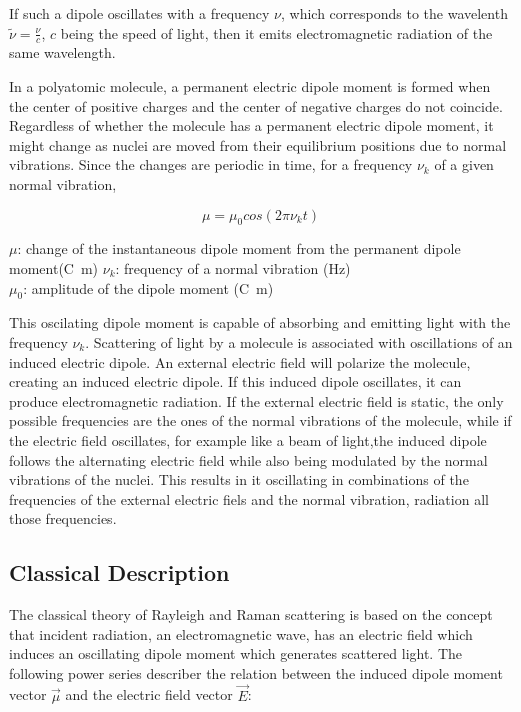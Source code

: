 If such a dipole oscillates with a frequency \(\nu\), which corresponds to the wavelenth \(\widetilde{\nu}=\frac{\nu}{c}\), \(c\) being the speed of light, then it emits electromagnetic radiation of the same wavelength.

\bigskip

In a polyatomic molecule, a permanent electric dipole moment is formed when the center of positive charges and the center of negative charges do not coincide. Regardless of whether the molecule has a permanent electric dipole moment, it might change as nuclei are moved from their equilibrium positions due to normal vibrations. Since the changes are periodic in time, for a frequency \(\nu_k\) of a given normal vibration, 

\begin{equation}
    \mu=\mu_0cos(2\pi\nu_kt)
\end{equation}

\(\mu\): change of the instantaneous dipole moment from the permanent dipole moment(\unit{\coulomb\meter})
\(\nu_k\): frequency of a normal vibration (\unit{\hertz})\\
\(\mu_0\): amplitude of the dipole moment (\unit{\coulomb\meter})

\bigskip

This oscilating dipole moment is capable of absorbing and emitting light with the frequency \(\nu_k\).
Scattering of light by a molecule is associated with oscillations of an induced electric dipole. An external electric field will polarize the molecule, creating an induced electric dipole. If this induced dipole oscillates, it can produce electromagnetic radiation. If the external electric field is static, the only possible frequencies are the ones of the normal vibrations of the molecule, while if the electric field oscillates, for example like a beam of light,the induced dipole follows the alternating electric field while also being modulated by the normal vibrations of the nuclei. This results in it oscillating in combinations of the frequencies of the external electric fiels and the normal vibration, radiation all those frequencies.

\subsection{Classical Description}


The classical theory of Rayleigh and Raman scattering is based on the concept that incident radiation, an electromagnetic wave, has an electric field which induces an oscillating dipole moment which generates scattered light. The following power series describer the relation between the induced dipole moment vector \(\overrightarrow{\mu} \) and the electric field vector \(\overrightarrow{E} \): 

